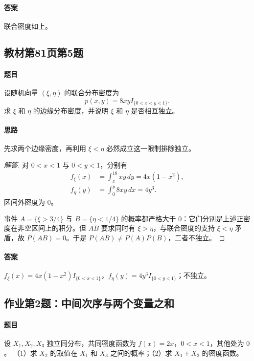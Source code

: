 \paragraph{答案}联合密度如上。

\subsection{教材第81页第5题}\label{ex:w11-b81-5}
\paragraph{题目}
设随机向量 $(\xi,\eta)$ 的联合分布密度为
\[
p(x,y)=8xyI_{\{0<x<y<1\}}.
\]
求 $\xi$ 和 $\eta$ 的边缘分布密度，并说明 $\xi$ 和 $\eta$ 是否相互独立。
\paragraph{思路}先求两个边缘密度，再利用 $\xi<\eta$ 必然成立这一限制排除独立。
\begin{proof}[解答]
对 $0<x<1$ 与 $0<y<1$，分别有
\begin{align*}
f_\xi(x)&=\int_x^18xy\,dy=4x(1-x^2),\\
f_\eta(y)&=\int_0^y8xy\,dx=4y^3.
\end{align*}
区间外密度为 $0$。

事件 $A=\{\xi>3/4\}$ 与 $B=\{\eta<1/4\}$ 的概率都严格大于 $0$：它们分别是上述正密度在非空区间上的积分。但 $AB$ 要求同时有 $\xi>\eta$，与联合密度的支持 $\xi<\eta$ 矛盾，故 $P(AB)=0$。于是 $P(AB)\ne P(A)P(B)$，二者不独立。
\end{proof}
\paragraph{答案}$f_\xi(x)=4x(1-x^2)I_{\{0<x<1\}}$，$f_\eta(y)=4y^3I_{\{0<y<1\}}$；不独立。

\subsection{作业第2题：中间次序与两个变量之和}\label{ex:w11-h2}
\paragraph{题目}
设 $X_1,X_2,X_3$ 独立同分布，共同密度函数为 $f(x)=2x$，$0<x<1$，其他处为 $0$。
（1）求 $X_2$ 的取值在 $X_1$ 和 $X_3$ 之间的概率；（2）求 $X_1+X_2$ 的密度函数。
